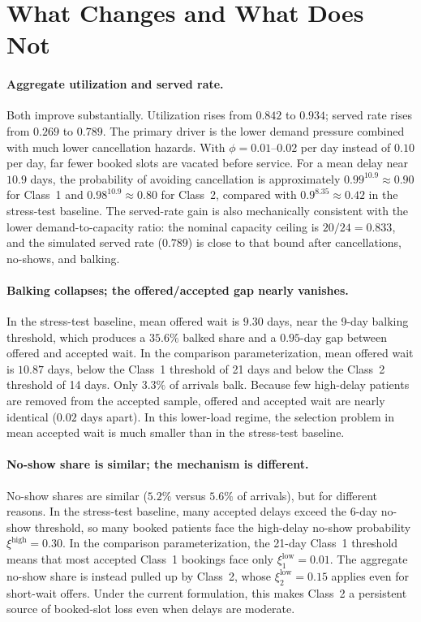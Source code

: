 \documentclass[11pt]{article}
\begin{document}
\section{What Changes and What Does Not}

\paragraph{Aggregate utilization and served rate.}
Both improve substantially. Utilization rises from $0.842$ to $0.934$; served
rate rises from $0.269$ to $0.789$. The primary driver is the lower demand
pressure combined with much lower cancellation hazards. With
$\phi=0.01$--$0.02$ per day instead of $0.10$ per day, far fewer booked slots
are vacated before service. For a mean delay near $10.9$ days, the probability
of avoiding cancellation is approximately $0.99^{10.9}\approx0.90$ for Class~1
and $0.98^{10.9}\approx0.80$ for Class~2, compared with
$0.9^{8.35}\approx0.42$ in the stress-test baseline. The served-rate gain is
also mechanically consistent with the lower demand-to-capacity ratio: the
nominal capacity ceiling is $20/24=0.833$, and the simulated served rate
($0.789$) is close to that bound after cancellations, no-shows, and balking.

\paragraph{Balking collapses; the offered/accepted gap nearly vanishes.}
In the stress-test baseline, mean offered wait is $9.30$ days, near the 9-day
balking threshold, which produces a $35.6\%$ balked share and a $0.95$-day gap
between offered and accepted wait. In the comparison parameterization, mean
offered wait is $10.87$ days, below the Class~1 threshold of 21 days and below
the Class~2 threshold of 14 days. Only $3.3\%$ of arrivals balk. Because few
high-delay patients are removed from the accepted sample, offered and accepted
wait are nearly identical ($0.02$ days apart). In this lower-load regime, the
selection problem in mean accepted wait is much smaller than in the stress-test
baseline.

\paragraph{No-show share is similar; the mechanism is different.}
No-show shares are similar ($5.2\%$ versus $5.6\%$ of arrivals), but for
different reasons. In the stress-test baseline, many accepted delays exceed the
6-day no-show threshold, so many booked patients face the high-delay no-show
probability $\xi^{\text{high}}=0.30$. In the comparison parameterization, the
21-day Class~1 threshold means that most accepted Class~1 bookings face only
$\xi^{\text{low}}_1=0.01$. The aggregate no-show share is instead pulled up by
Class~2, whose $\xi^{\text{low}}_2=0.15$ applies even for short-wait offers.
Under the current formulation, this makes Class~2 a persistent source of
booked-slot loss even when delays are moderate.
\end{document}

